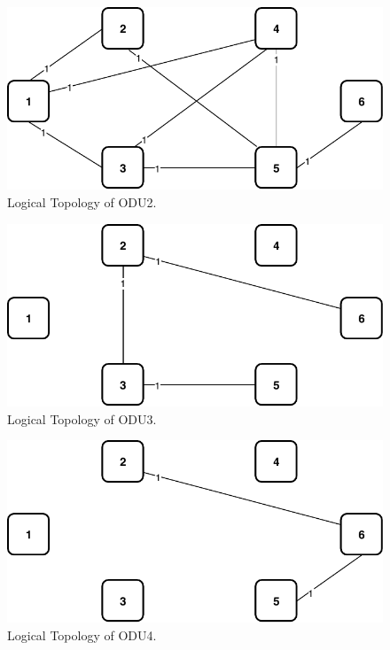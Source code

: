 \begin{figure}[h!]
\centering
\includegraphics[width=12cm]{sdf/ilp/opaque_protection/figures/logical_topology_ODU2_low}
\caption{Logical Topology of ODU2.}
\label{logical_ODU2_protectionlow}
\end{figure}

\begin{figure}[h!]
\centering
\includegraphics[width=12cm]{sdf/ilp/opaque_protection/figures/logical_topology_ODU3_low}
\caption{Logical Topology of ODU3.}
\label{logical_ODU3_protectionlow}
\end{figure}
\newpage
\begin{figure}[h!]
\centering
\includegraphics[width=12cm]{sdf/ilp/opaque_protection/figures/logical_topology_ODU4_low}
\caption{Logical Topology of ODU4.}
\label{logical_ODU4_protectionlow}
\end{figure}

